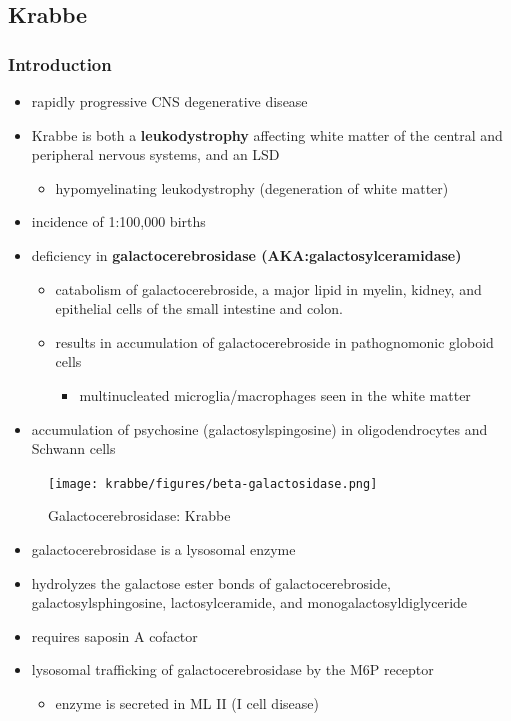\documentclass[12pt]{scrartcl}
\begin{document}
\subsection{Krabbe}
\label{sec:orgb5ff3ff}
\subsubsection{Introduction}
\label{sec:orgbd4fd8d}
\begin{itemize}
\item rapidly progressive CNS degenerative disease
\item Krabbe is both a \textbf{leukodystrophy} affecting white matter of the central
and peripheral nervous systems, and an LSD
\begin{itemize}
\item hypomyelinating leukodystrophy (degeneration of white matter)
\end{itemize}
\item incidence of 1:100,000 births
\item deficiency in \textbf{galactocerebrosidase (AKA:galactosylceramidase)} 
\begin{itemize}
\item catabolism of galactocerebroside, a major lipid in myelin, kidney, and epithelial cells of the small intestine and colon.
\item results in accumulation of galactocerebroside in pathognomonic globoid cells
\begin{itemize}
\item multinucleated microglia/macrophages seen in the white matter
\end{itemize}
\end{itemize}
\item accumulation of psychosine (galactosylspingosine) in oligodendrocytes and Schwann cells
\end{itemize}

\begin{figure}[htbp]
\centering
\texttt{[image: krabbe/figures/beta-galactosidase.png]}
\caption{\label{fig:org5d60c77}Galactocerebrosidase: Krabbe}
\end{figure}

\begin{itemize}
\item galactocerebrosidase is a lysosomal enzyme
\item hydrolyzes the galactose ester bonds of galactocerebroside, galactosylsphingosine, lactosylceramide, and monogalactosyldiglyceride
\item requires saposin A cofactor
\item lysosomal trafficking of galactocerebrosidase by the M6P receptor
\begin{itemize}
\item enzyme is secreted in ML II (I cell disease)
\end{itemize}
\end{itemize}
\end{document}
